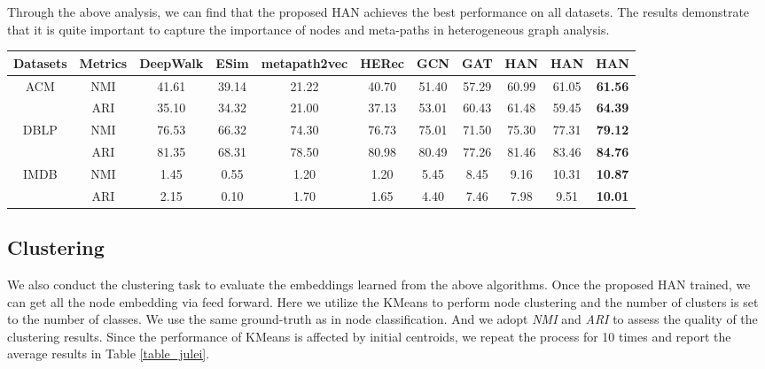 Through the above analysis, we can find that the proposed HAN achieves the best performance on all datasets. The results demonstrate that it is quite important to capture the importance of nodes and meta-paths in heterogeneous graph analysis.






\begin{table*}[]
	\centering
	\caption{Qantitative results (\%) on the node clustering task.}
	\label{table_julei}
\begin{tabular}{|c|c||c|c|c|c|c|c||c|c|c|}
		\hline
		Datasets              & Metrics & DeepWalk    & ESim  & metapath2vec & HERec & GCN   & GAT   & HAN & HAN & HAN           \\ \hline
		\multirow{2}{*}{ACM}  & NMI     & 41.61 & 39.14 & 21.22  & 40.70 & 51.40 & 57.29 & 60.99       & 61.05       & \textbf{61.56} \\
		& ARI     & 35.10 & 34.32 & 21.00  & 37.13 & 53.01 & 60.43 & 61.48       & 59.45       & \textbf{64.39} \\ \hline
		\multirow{2}{*}{DBLP} & NMI     & 76.53 & 66.32 & 74.30  & 76.73 & 75.01 & 71.50 & 75.30       & 77.31       & \textbf{79.12} \\
		& ARI     & 81.35 & 68.31 & 78.50  & 80.98 & 80.49 & 77.26 & 81.46       & 83.46       & \textbf{84.76} \\ \hline
		\multirow{2}{*}{IMDB} & NMI     & 1.45  & 0.55  & 1.20   & 1.20  & 5.45  & 8.45  & 9.16        & 10.31       & \textbf{10.87} \\
		& ARI     & 2.15  & 0.10  & 1.70   & 1.65  & 4.40  & 7.46  & 7.98        & 9.51       & \textbf{10.01} \\ \hline
	\end{tabular}
\end{table*}



\subsection{Clustering}
We also conduct the clustering task to evaluate the embeddings learned from the above algorithms. 
Once the proposed HAN trained, we can get all the node embedding via feed forward.
Here we utilize the KMeans to perform node clustering and the number of clusters  is set to the number of classes. We use the same ground-truth as in node classification.
And we adopt \emph{NMI} and \emph{ARI} to assess the quality of the clustering results. 
Since the performance of KMeans is affected by initial centroids, we repeat the process for 10 times and report the average results in Table \ref{table_julei}.

